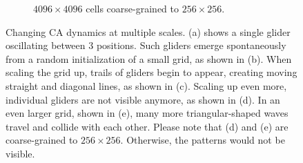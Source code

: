 \begin{figure}[htbp]
\begin{subfigure}{.48\linewidth}
    \caption{\label{subfig:waves_c} $4096 \times 4096$ cells coarse-grained to $256 \times 256$.}
  \end{subfigure}
  \caption{\label{fig:dynamics_levels} Changing CA dynamics at multiple scales.
    (a) shows a single glider oscillating between 3 positions. Such gliders
    emerge spontaneously from a random initialization of a small grid, as shown
    in (b). When scaling the grid up, trails of gliders begin to appear,
    creating moving straight and diagonal lines, as shown in (c). Scaling up even
    more, individual gliders are not visible anymore, as shown in (d). In an
    even larger grid, shown in (e), many more triangular-shaped waves travel and
    collide with each other. Please note that (d) and (e) are coarse-grained to
    $256 \times 256$. Otherwise, the patterns would not be visible.}
\end{figure}


